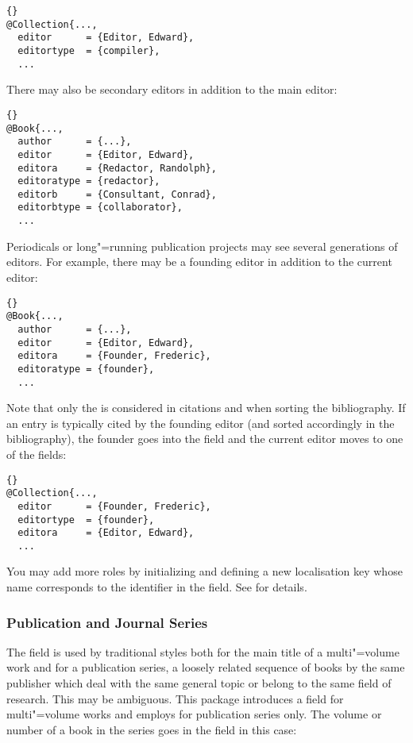\documentclass{ltxdockit}[2011/03/25]
\begin{document}
\begin{lstlisting}[style=bibtex]{}
@Collection{...,
  editor      = {Editor, Edward},
  editortype  = {compiler},
  ...
\end{lstlisting}
%
There may also be secondary editors in addition to the main editor:

\begin{lstlisting}[style=bibtex]{}
@Book{...,
  author      = {...},
  editor      = {Editor, Edward},
  editora     = {Redactor, Randolph},
  editoratype = {redactor},
  editorb     = {Consultant, Conrad},
  editorbtype = {collaborator},
  ...
\end{lstlisting}
%
Periodicals or long"=running publication projects may see several generations of editors. For example, there may be a founding editor in addition to the current editor:

\begin{lstlisting}[style=bibtex]{}
@Book{...,
  author      = {...},
  editor      = {Editor, Edward},
  editora     = {Founder, Frederic},
  editoratype = {founder},
  ...
\end{lstlisting}
%
Note that only the  is considered in citations and when sorting the bibliography. If an entry is typically cited by the founding editor (and sorted accordingly in the bibliography), the founder goes into the  field and the current editor moves to one of the  fields:

\begin{lstlisting}[style=bibtex]{}
@Collection{...,
  editor      = {Founder, Frederic},
  editortype  = {founder},
  editora     = {Editor, Edward},
  ...
\end{lstlisting}
%
You may add more roles by initializing and defining a new localisation key whose name corresponds to the identifier in the  field. See  for details. 

\subsubsection{Publication and Journal Series}
\label{bib:use:ser}

The  field is used by traditional \bibtex styles both for the main title of a multi"=volume work and for a publication series, \ie a loosely related sequence of books by the same publisher which deal with the same general topic or belong to the same field of research. This may be ambiguous. This package introduces a  field for multi"=volume works and employs  for publication series only. The volume or number of a book in the series goes in the  field in this case:
\end{document}
